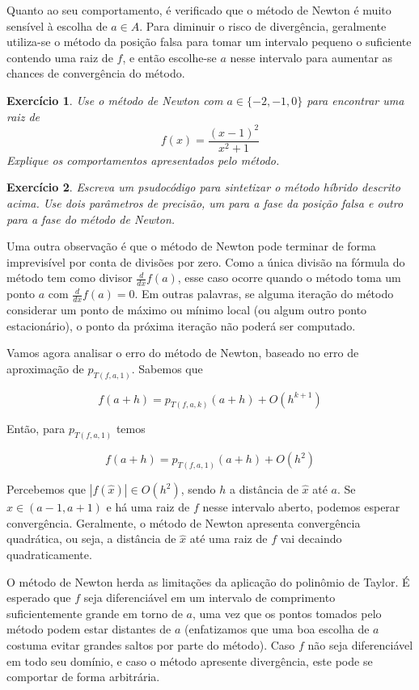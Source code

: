 \documentclass[]{article}
\newtheorem{exercicio}{Exercício}
\numberwithin{equation}{section}
\begin{document}
Quanto ao seu comportamento, é verificado que o método de Newton é muito sensível à escolha de $a \in A$. Para diminuir o risco de divergência, geralmente utiliza-se o método da posição falsa para tomar um intervalo pequeno o suficiente contendo uma raiz de $f$, e então escolhe-se $a$ nesse intervalo para aumentar as chances de convergência do método.

\begin{exercicio}
	Use o método de Newton com $a \in \{-2, -1, 0\}$ para encontrar uma raiz de $$f(x) = \frac{(x - 1)^2}{x^2 + 1}$$ Explique os comportamentos apresentados pelo método.
\end{exercicio}

\begin{exercicio}
	Escreva um psudocódigo para sintetizar o método híbrido descrito acima. Use dois parâmetros de precisão, um para a fase da posição falsa e outro para a fase do método de Newton.
\end{exercicio}

Uma outra observação é que o método de Newton pode terminar de forma imprevisível por conta de divisões por zero. Como a única divisão na fórmula do método tem como divisor $\frac{d}{dx} f(a)$, esse caso ocorre quando o método toma um ponto $a$ com $\frac{d}{dx} f(a) = 0$. Em outras palavras, se alguma iteração do método considerar um ponto de máximo ou mínimo local (ou algum outro ponto estacionário), o ponto da próxima iteração não poderá ser computado.

Vamos agora analisar o erro do método de Newton, baseado no erro de aproximação de $p_{T(f, a, 1)}$. Sabemos que

$$
f(a + h) = p_{T(f, a, k)}(a + h) + O(h^{k + 1})
$$

Então, para $p_{T(f, a, 1)}$ temos

$$
f(a + h) = p_{T(f, a, 1)}(a + h) + O(h^2)
$$

Percebemos que $|f(\hat{x})|\in O(h^2)$, sendo $h$ a distância de
$\hat{x}$ até $a$. Se $\hat{x} \in (a - 1, a + 1)$ e há uma raiz de
$f$ nesse intervalo aberto, podemos esperar convergência. Geralmente,
o método de Newton apresenta convergência quadrática, ou seja, a
distância de $\hat{x}$ até uma raiz de $f$ vai decaindo
quadraticamente.

O método de Newton herda as limitações da aplicação do polinômio de
Taylor. É esperado que $f$ seja diferenciável em um intervalo de
comprimento suficientemente grande em torno de $a$, uma vez que os
pontos tomados pelo método podem estar distantes de $a$ (enfatizamos
que uma boa escolha de $a$ costuma evitar grandes saltos por parte do
método). Caso $f$ não seja diferenciável em todo seu domínio, e caso o
método apresente divergência, este pode se comportar de forma
arbitrária.
\end{document}
